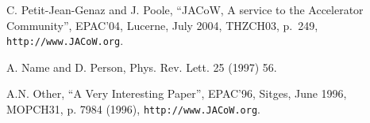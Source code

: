 \begin{thebibliography}{9}   %

C. Petit-Jean-Genaz and J. Poole, ``JACoW, A service to the Accelerator Community'',
EPAC'04, Lucerne, July 2004, THZCH03,  p.~249, \texttt{http://www.JACoW.org}.

 A. Name and D. Person, Phys. Rev. Lett. 25 (1997) 56.

A.N. Other, ``A Very Interesting Paper'', EPAC'96, Sitges, June 1996, MOPCH31, p. 7984 (1996),
\texttt{http://www.JACoW.org}.


\end{thebibliography}


